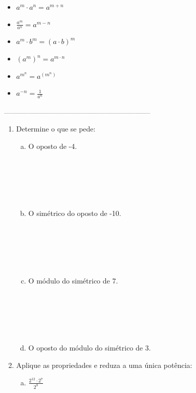 \documentclass[a4paper,14pt]{article}
\begin{document}
\begin{multicols}{2}
\begin{itemize}
	    	\begin{itemize}[label=\scriptsize$\blacksquare$]
	    		\item $a^m \cdot a^n = a^{m + n}$
	    		\item $\frac{a^m}{a^n} = a^{m - n}$
	    		\item $a^m \cdot b^m = (a \cdot b)^m$
	    		\item $(a^m)^n = a^{m \cdot n}$
	    		\item $a^{m^{n}} = a^{(m^n)}$
	    		\item $a^{-n} = \frac{1}{a^n}$
	    	\end{itemize}
	    \end{itemize} 
		\noindent\textsubscript{--------------------------------------------------------------------------}
		\begin{enumerate} 
			\item Determine o que se pede:
			\begin{enumerate}[a)]
				\item O oposto de -4. \\\\\\\\\\\\
				\item O simétrico do oposto de -10. \\\\\\\\\\\\
				\item O módulo do simétrico de 7. \\\\\\\\\\\\
				\item O oposto do módulo do simétrico de 3. \newpage
			\end{enumerate}
			\item Aplique as propriedades e reduza a uma única potência:
			\begin{enumerate}[a)]
				\item $\frac{2^{12} \cdot 2^7}{2^8}$ \\\\\\\\\\\\\\\\\\\\\\\\\\\\\\\\\\\\

\end{enumerate}
\end{enumerate}
\end{multicols}
\end{document}
